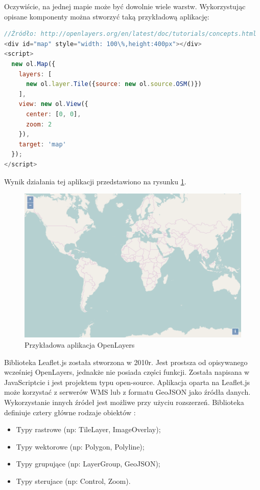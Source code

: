 Oczywiście, na jednej mapie może być dowolnie wiele warstw. Wykorzystując opisane komponenty można stworzyć taką przykładową aplikację:

\begin{lstlisting}[frame=L, language=JavaScript]
//Źródło: http://openlayers.org/en/latest/doc/tutorials/concepts.html
<div id="map" style="width: 100\%,height:400px"></div>
<script>
  new ol.Map({
    layers: [
      new ol.layer.Tile({source: new ol.source.OSM()})
    ],
    view: new ol.View({
      center: [0, 0],
      zoom: 2
    }),
    target: 'map'
  });
</script>
\end{lstlisting}

Wynik działania tej aplikacji przedstawiono na rysunku \ref{fig:openlayers_example}.

\begin{figure}[h!]
    \centering
    \includegraphics[width=1.0\textwidth]{img/openlayers_example.png}
    \caption{Przykładowa aplikacja OpenLayers}
    \label{fig:openlayers_example}
\end{figure}

Biblioteka Leaflet.js została stworzona w 2010r. Jest prostsza od opisywanego wcześniej OpenLayers, jednakże nie posiada części funkcji.
Została napisana w JavaScriptcie i jest projektem typu open-source.
Aplikacja oparta na Leaflet.js może korzystać z serwerów WMS lub z formatu GeoJSON jako źródła danych. Wykorzystanie innych źródeł jest możliwe
przy użyciu rozszerzeń. Biblioteka definiuje cztery główne rodzaje obiektów \cite{website:LeafletDocumentation}:
\begin{itemize}
    \item Typy rastrowe (np: TileLayer, ImageOverlay);
    \item Typy wektorowe (np: Polygon, Polyline);
    \item Typy grupujące (np: LayerGroup, GeoJSON);
    \item Typy sterujace (np: Control, Zoom).
\end{itemize}

